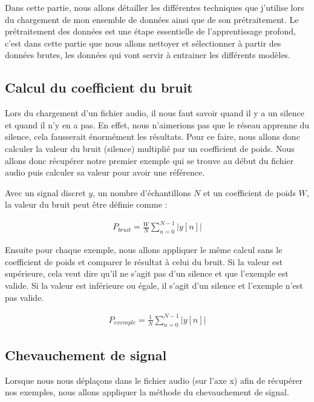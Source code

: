 Dans cette partie, nous allons détailler les différentes techniques que j'utilise lors du chargement de mon ensemble de données ainsi que de son prétraitement. Le prétraitement des données est une étape essentielle de l'apprentissage profond, c'est dans cette partie que nous allons nettoyer et sélectionner à partir des données brutes, les données qui vont servir à entrainer les différents modèles.

\subsection{Calcul du coefficient du bruit}

Lors du chargement d'un fichier audio, il nous faut savoir quand il y a un silence et quand il n'y en a pas. En effet, nous n'aimerions pas que le réseau apprenne du silence, cela fausserait énormément les résultats. Pour ce faire, nous allons donc calculer la valeur du bruit (silence) multiplié par un coefficient de poids. Nous allons donc récupérer notre premier exemple qui se trouve au début du fichier audio puis calculer sa valeur pour avoir une référence.

Avec un signal discret $y$, un nombre d'échantillons $N$ et un coefficient de poids $W$, la valeur du bruit peut être définie comme :

{\Large
	\setlength{\abovedisplayskip}{-0.5cm}
	\begin{align*}
		P_{bruit} = \frac{W}{N}\sum_{n=0}^{N-1}{\lvert y[n]\rvert}
	\end{align*}
}

Ensuite pour chaque exemple, nous allons appliquer le même calcul sans le coefficient de poids et comparer le résultat à celui du bruit. Si la valeur est supérieure, cela veut dire qu'il ne s’agit pas d'un silence et que l'exemple est valide. Si la valeur est inférieure ou égale, il s'agit d'un silence et l'exemple n'est pas valide.

{\Large
	\setlength{\abovedisplayskip}{-0.5cm}
	\begin{align*}
		P_{exemple} = \frac{1}{N}\sum_{n=0}^{N-1}{\lvert y[n]\rvert}
	\end{align*}
}

\subsection{Chevauchement de signal}

Lorsque nous nous déplaçons dans le fichier audio (sur l'axe x) afin de récupérer nos exemples, nous allons appliquer la méthode du chevauchement de signal.

